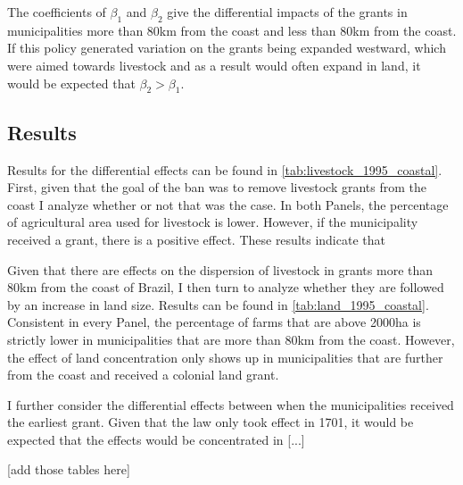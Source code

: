 \documentclass{article}
\begin{document}
The coefficients of $\beta_1$ and $\beta_2$ give the differential impacts of the grants in municipalities more than 80km from the coast and less than 80km from the coast. 
If this policy generated variation on the grants being expanded westward, which were aimed towards livestock and as a result would often expand in land, it would be expected that $\beta_2 > \beta_1$.


\subsection{Results}

Results for the differential effects can be found in \autoref{tab:livestock_1995_coastal}. 
First, given that the goal of the ban was to remove livestock grants from the coast I analyze whether or not that was the case.
In both Panels, the percentage of agricultural area used for livestock is lower.
However, if the municipality received a grant, there is a positive effect.
These results indicate that 

Given that there are effects on the dispersion of livestock in grants more than 80km from the coast of Brazil, I then turn to analyze whether they are followed by an increase in land size.
Results can be found in \autoref{tab:land_1995_coastal}.
Consistent in every Panel, the percentage of farms that are above 2000ha is strictly lower in municipalities that are more than 80km from the coast. However, the effect of land concentration only shows up in municipalities that are further from the coast and received a colonial land grant. 

I further consider the differential effects between when the municipalities received the earliest grant. 
Given that the law only took effect in 1701, it would be expected that the effects would be concentrated in [...]

[add those tables here]



\end{document}
